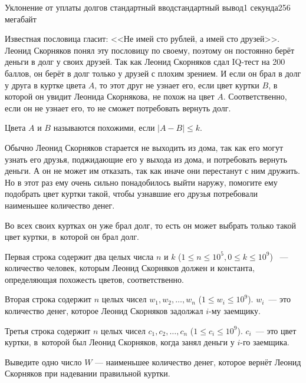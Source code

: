 \begin{problem}[(Парников В.\,В.)]{Уклонение от уплаты долгов }{стандартный ввод}{стандартный вывод}{1 секунда}{256 мегабайт}

Известная пословица гласит: <<Не имей сто рублей, а имей сто друзей>>. Леонид Скорняков понял эту пословицу по своему, поэтому он постоянно берёт деньги в долг у своих друзей. Так как Леонид Скорняков сдал IQ-тест на 200 баллов, он берёт в долг только у друзей с плохим зрением. И если он брал в долг у друга в куртке цвета $A$, то этот друг не узнает его, если цвет куртки $B$, в которой он увидит Леонида Скорнякова, не похож на цвет $A$. Соответственно, если он не узнает его, то не сможет потребовать вернуть долг. 

Цвета $A$ и $B$ называются похожими, если $|A - B| \leq k$. 

Обычно Леонид Скорняков старается не выходить из дома, так как его могут узнать его друзья, поджидающие его у выхода из дома, и потребовать вернуть деньги. А он не может им отказать, так как иначе они перестанут с ним дружить. Но в этот раз ему очень сильно понадобилось выйти наружу, помогите ему подобрать цвет куртки такой, чтобы узнавшие его друзья потребовали наименьшее количество денег. 

Во всех своих куртках он уже брал долг, то есть он может выбрать только такой цвет куртки, в~которой он брал долг.

\InputFile
Первая строка содержит два целых числа $n$ и $k$ ($1 \leq n \leq 10^5, 0 \leq k \leq 10^9$) ~--- количество человек, которым Леонид Скорняков должен и константа, определяющая похожесть цветов, соответственно. 

Вторая строка содержит $n$ целых чисел $w_1, w_2, \dots, w_n$ ($1 \leq w_i \leq 10^9$).  $w_i$~--- это количество денег, которое Леонид Скорняков задолжал $i$-му заемщику. 

Третья строка содержит $n$ целых чисел $c_1, c_2, \dots, c_n$ ($1 \leq c_i \leq 10^9$). $c_i$~--- это цвет куртки, в~которой был Леонид Скорняков, когда занял деньги у $i$-го заемщика.

\OutputFile
Выведите одно число $W$ --- наименьшее количество денег, которое вернёт Леонид Скорняков при надевании правильной куртки.

\Example

\begin{example}
%
\end{example}

\end{problem}

